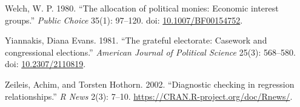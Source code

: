 \documentclass[12pt,]{article}
\newlength{\cslhangindent}
\newenvironment{CSLReferences}%
    {\setlength{\parindent}{0pt}%
    \everypar{\setlength{\hangindent}{\cslhangindent}}\ignorespaces}%
    {\par}
\begin{document}
\begin{CSLReferences}{1}{0}
\leavevmode{}%
Welch, W. P. 1980. {``The allocation of political monies: Economic
interest groups.''} \emph{Public Choice} 35(1): 97--120. doi:
\href{https://doi.org/10.1007/BF00154752}{10.1007/BF00154752}.

\leavevmode{}%
Yiannakis, Diana Evans. 1981. {``The grateful electorate: Casework and
congressional elections.''} \emph{American Journal of Political Science}
25(3): 568--580. doi:
\href{https://doi.org/10.2307/2110819}{10.2307/2110819}.

\leavevmode{}%
Zeileis, Achim, and Torsten Hothorn. 2002. {``Diagnostic checking in
regression relationships.''} \emph{R News} 2(3): 7--10.
\url{https://CRAN.R-project.org/doc/Rnews/}.

\end{CSLReferences}





\newpage

\singlespacing 
\end{document}
